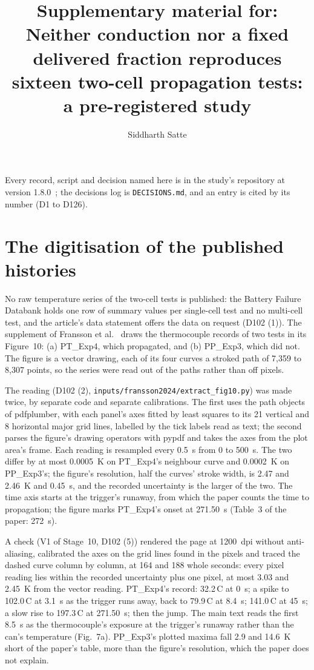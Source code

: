 \documentclass[preprint,12pt]{elsarticle}
\newcommand{\degC}{\,\textdegree C}
\begin{document}
\begin{frontmatter}
\title{Supplementary material for: Neither conduction nor a fixed delivered fraction reproduces sixteen two-cell propagation tests: a pre-registered study}
\author{Siddharth Satte}
\address{Independent researcher, Pune, India}
\end{frontmatter}

Every record, script and decision named here is in the study's repository at version 1.8.0~\cite{satte2026repo}; the decisions log is \texttt{DECISIONS.md}, and an entry is cited by its number (D1 to D126).

\section{The digitisation of the published histories}
\label{sec:s-digitisation}

No raw temperature series of the two-cell tests is published: the Battery Failure Databank holds one row of summary values per single-cell test and no multi-cell test, and the article's data statement offers the data on request (D102 (1)). The supplement of Fransson et al.~\cite{fransson2024exploring} draws the thermocouple records of two tests in its Figure~10: (a) PT\_Exp4, which propagated, and (b) PP\_Exp3, which did not. The figure is a vector drawing, each of its four curves a stroked path of 7,359 to 8,307 points, so the series were read out of the paths rather than off pixels.

The reading (D102 (2), \texttt{inputs/fransson2024/extract\_fig10.py}) was made twice, by separate code and separate calibrations. The first uses the path objects of pdfplumber, with each panel's axes fitted by least squares to its 21 vertical and 8 horizontal major grid lines, labelled by the tick labels read as text; the second parses the figure's drawing operators with pypdf and takes the axes from the plot area's frame. Each reading is resampled every 0.5~s from 0 to 500~s. The two differ by at most 0.0005~K on PT\_Exp4's neighbour curve and 0.0002~K on PP\_Exp3's; the figure's resolution, half the curves' stroke width, is 2.47 and 2.46~K and 0.45~s, and the recorded uncertainty is the larger of the two. The time axis starts at the trigger's runaway, from which the paper counts the time to propagation; the figure marks PT\_Exp4's onset at 271.50~s (Table~3 of the paper: 272~s).

A check (V1 of Stage~10, D102 (5)) rendered the page at 1200~dpi without anti-aliasing, calibrated the axes on the grid lines found in the pixels and traced the dashed curve column by column, at 164 and 188 whole seconds: every pixel reading lies within the recorded uncertainty plus one pixel, at most 3.03 and 2.45~K from the vector reading. PT\_Exp4's record: 32.2\degC{} at 0~s; a spike to 102.0\degC{} at 3.1~s as the trigger runs away, back to 79.9\degC{} at 8.4~s; 141.0\degC{} at 45~s; a slow rise to 197.3\degC{} at 271.50~s; then the jump. The main text reads the first 8.5~s as the thermocouple's exposure at the trigger's runaway rather than the can's temperature (Fig.~7a). PP\_Exp3's plotted maxima fall 2.9 and 14.6~K short of the paper's table, more than the figure's resolution, which the paper does not explain.
\end{document}
